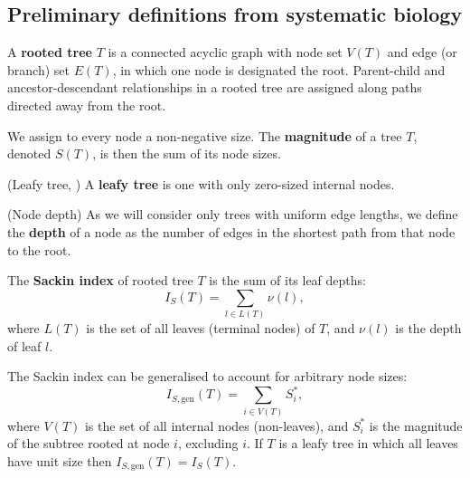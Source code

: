 \subsection{Preliminary definitions from systematic biology}\label{defsec}

\begin{definition}
    A \textbf{rooted tree} $T$ is a connected acyclic graph with node set $V(T)$
    and edge (or branch) set $E(T)$, in which one node is designated the root.
    Parent-child and ancestor-descendant relationships in a rooted tree are
    assigned along paths directed away from the root.
\end{definition}

\begin{definition}
    We assign to every node a non-negative size. The \textbf{magnitude} of a
    tree $T$, denoted $S(T)$, is then the sum of its node sizes.
\end{definition}

\begin{definition}(Leafy tree, \citet{lemant_robust_2022})
    A \textbf{leafy tree} is one with only zero-sized internal nodes.
\end{definition}

\begin{definition}(Node depth)
    As we will consider only trees with uniform edge lengths, we define the
    \textbf{depth} of a node as the number of edges in the shortest path from
    that node to the root.
\end{definition}

\begin{definition}
    The \textbf{Sackin index} of rooted tree $T$ is the sum of its leaf depths:
    \begin{equation}\label{sackindef}
        I_S(T) = \sum_{l\in L(T)} \nu(l),
    \end{equation}
    where $L(T)$ is the set of all leaves (terminal nodes) of $T$, and $\nu(l)$
    is the depth of leaf $l$.
\end{definition}

\begin{definition}
    The Sackin index can be generalised to account for arbitrary node sizes:
    \begin{equation}\label{gensackindef}
        I_{S,\text{gen}}(T) = \sum_{i\in V(T)} S_i^*,
    \end{equation}
    where $V(T)$ is the set of all internal nodes (non-leaves), and $S_i^*$ is
    the magnitude of the subtree rooted at node $i$, excluding $i$. If $T$ is a
    leafy tree in which all leaves have unit size then
    $I_{S,\text{gen}}(T) = I_S(T)$.
\end{definition}

